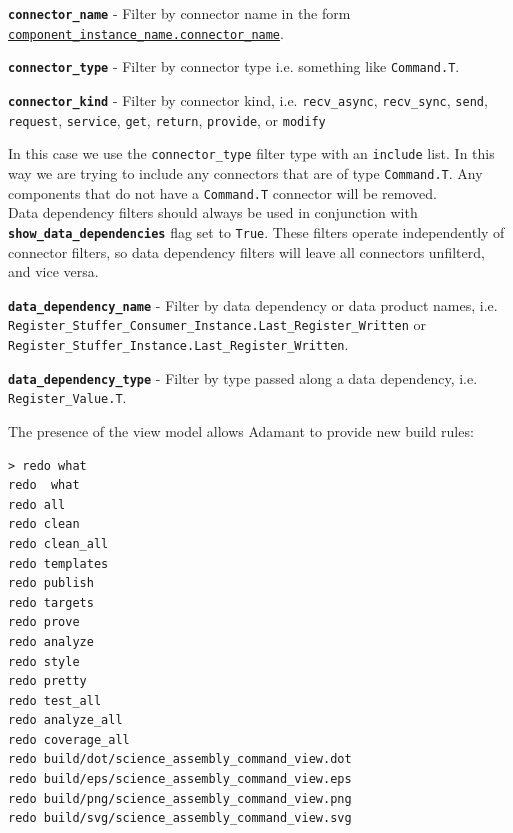 \vspace{5mm} %
\begin{spaceditemize}
  \item \textbf{\texttt{connector\_name}} - Filter by connector name in the form \texttt{\url{component\_instance\_name.connector\_name}}.
  \item \textbf{\texttt{connector\_type}} - Filter by connector type i.e. something like \texttt{Command.T}.
  \item \textbf{\texttt{connector\_kind}} - Filter by connector kind, i.e. \texttt{recv\_async}, \texttt{recv\_sync}, \texttt{send}, \texttt{request}, \texttt{service}, \texttt{get}, \texttt{return}, \texttt{provide}, or \texttt{modify}
\end{spaceditemize}
\vspace{5mm} %

In this case we use the \texttt{connector\_type} filter type with an \texttt{include} list. In this way we are trying to include any connectors that are of type \texttt{Command.T}. Any components that do not have a \texttt{Command.T} connector will be removed. \\

Data dependency filters should always be used in conjunction with \textbf{\texttt{show\_data\_dependencies}} flag set to \texttt{True}. These filters operate independently of connector filters, so data dependency filters will leave all connectors unfilterd, and vice versa.

\vspace{5mm} %
\begin{spaceditemize}
  \item \textbf{\texttt{data\_dependency\_name}} - Filter by data dependency or data product names, i.e. \texttt{Register\_Stuffer\_Consumer\_Instance.Last\_Register\_Written} or \texttt{Register\_Stuffer\_Instance.Last\_Register\_Written}.
  \item \textbf{\texttt{data\_dependency\_type}} - Filter by type passed along a data dependency, i.e. \texttt{Register\_Value.T}.
\end{spaceditemize}
\vspace{5mm} %

The presence of the view model allows Adamant to provide new build rules:

\vspace{5mm} %
\begin{verbatim}
> redo what
redo  what
redo all
redo clean
redo clean_all
redo templates
redo publish
redo targets
redo prove
redo analyze
redo style
redo pretty
redo test_all
redo analyze_all
redo coverage_all
redo build/dot/science_assembly_command_view.dot
redo build/eps/science_assembly_command_view.eps
redo build/png/science_assembly_command_view.png
redo build/svg/science_assembly_command_view.svg
\end{verbatim}
\vspace{5mm} %

